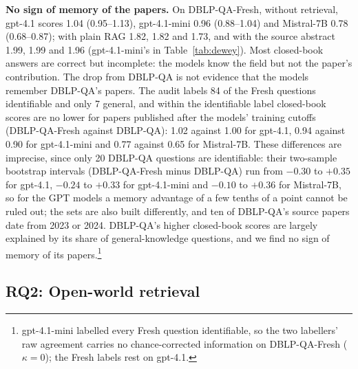 \documentclass[conference]{IEEEtran}
\newcommand{\dq}{DBLP-QA}
\newcommand{\fresh}{DBLP-QA-Fresh}
\begin{document}
\textbf{No sign of memory of the papers.} On \fresh{}, without retrieval, gpt-4.1 scores 1.04
(0.95--1.13), gpt-4.1-mini 0.96 (0.88--1.04) and Mistral-7B 0.78 (0.68--0.87); with plain RAG 1.82,
1.82 and 1.73, and with the source abstract 1.99, 1.99 and 1.96 (gpt-4.1-mini's in Table~\ref{tab:dewey}). Most closed-book answers are correct but incomplete: the
models know the field but not the paper's contribution. The drop from \dq{} is not evidence that the
models remember \dq{}'s papers. The audit labels 84 of the Fresh questions identifiable and only 7
general, and within the identifiable label closed-book scores are no lower for papers published after
the models' training cutoffs (\fresh{} against \dq{}): 1.02 against 1.00 for gpt-4.1, 0.94 against 0.90
for gpt-4.1-mini and 0.77 against 0.65 for Mistral-7B. These differences are imprecise, since only 20 \dq{} questions are
identifiable: their two-sample bootstrap intervals (\fresh{} minus \dq{}) run from $-0.30$ to $+0.35$ for
gpt-4.1, $-0.24$ to $+0.33$ for gpt-4.1-mini and $-0.10$ to $+0.36$ for Mistral-7B, so for the GPT models a
memory advantage of a few tenths of a point cannot be ruled out; the sets are also
built differently, and ten of \dq{}'s source papers date from 2023 or 2024. \dq{}'s higher closed-book
scores are largely explained by its share of general-knowledge questions, and we find no sign of memory of
its papers.\footnote{gpt-4.1-mini labelled every Fresh question identifiable, so the two labellers' raw
agreement carries no chance-corrected information on \fresh{} ($\kappa=0$); the Fresh labels rest on
gpt-4.1.}

\subsection{RQ2: Open-world retrieval}
\label{sec:rq2}
\end{document}
